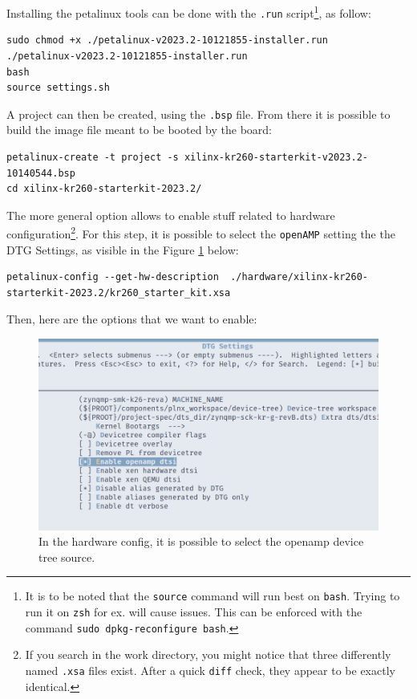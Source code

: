 \documentclass[10pt]{article}
\begin{document}
Installing the petalinux tools can be done with the \texttt{.run} script\footnote{It is to be noted that the \texttt{source} command will run best on \texttt{bash}. Trying
to run it on \texttt{zsh} for ex. will cause issues. This can be enforced with the
command \texttt{sudo dpkg-reconfigure bash}.}, as follow:
\begin{verbatim}
sudo chmod +x ./petalinux-v2023.2-10121855-installer.run
./petalinux-v2023.2-10121855-installer.run
bash
source settings.sh
\end{verbatim}

A project can then be created, using the \texttt{.bsp} file. From there it is possible to
build the image file meant to be booted by the board:
\begin{verbatim}
petalinux-create -t project -s xilinx-kr260-starterkit-v2023.2-10140544.bsp
cd xilinx-kr260-starterkit-2023.2/
\end{verbatim}


The more general option allows to enable stuff related to hardware
configuration\footnote{If you search in the work directory, you might notice that three
differently named \texttt{.xsa} files exist. After a quick \texttt{diff} check, they appear to be
exactly identical.}. For this step, it is possible to select the \texttt{openAMP}
setting the the DTG Settings, as visible in the Figure \ref{fig:orga07c477} below:
\begin{verbatim}
petalinux-config --get-hw-description  ./hardware/xilinx-kr260-starterkit-2023.2/kr260_starter_kit.xsa
\end{verbatim}

Then, here are the options that we want to enable:
\begin{figure}[htbp]
\centering
\includegraphics[width=.6\textwidth]{./img/yocto_openamp_dtg.png}
\caption{\label{fig:orga07c477}In the hardware config, it is possible to select the openamp device tree source.}
\end{figure}
\end{document}
